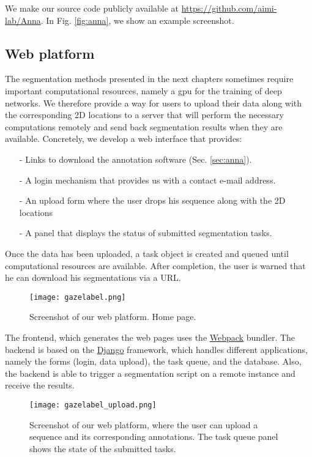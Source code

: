 We make our source code publicly available at \url{https://github.com/aimi-lab/Anna}.
In Fig. \ref{fig:anna}, we show an example screenshot.


\subsection{Web platform}
The segmentation methods presented in the next chapters sometimes require important computational resources, namely a \gls{gpu} for the training of deep networks.
We therefore provide a way for users to upload their data along with the corresponding 2D locations to a server that will perform the necessary computations remotely and send back segmentation results when they are available.
Concretely, we develop a web interface that provides:

\begin{itemize}
  \item[-]{Links to download the annotation software (Sec. \ref{sec:anna}).}
  \item[-]{A login mechanism that provides us with a contact e-mail address.}
  \item[-]{An upload form where the user drops his sequence along with the 2D locations}
  \item[-]{A panel that displays the status of submitted segmentation tasks.}
\end{itemize}

Once the data has been uploaded, a task object is created and queued until computational resources are available.
After completion, the user is warned that he can download his segmentations via a URL.

\begin{figure}[!htpb]
  \texttt{[image: gazelabel.png]}
  \caption{Screenshot of our web platform. Home page.}
  \label{fig:homepage}
\end{figure}

The frontend, which generates the web pages uses the \href{https://webpack.js.org}{Webpack} bundler.
The backend is based on the \href{https://www.djangoproject.com/}{Django} framework, which handles different applications, namely the forms (login, data upload), the task queue, and the database.
Also, the backend is able to trigger a segmentation script on a remote instance and receive the results.

\begin{figure}[!htpb]
  \texttt{[image: gazelabel\_upload.png]}
  \caption{Screenshot of our web platform, where the user can upload a sequence and its corresponding annotations. The task queue panel shows the state of the submitted tasks.}
  \label{fig:upload}
\end{figure}

